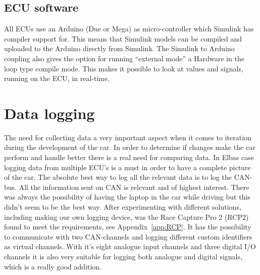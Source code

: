 \subsection{ECU software}
All ECUs use an Arduino (Due or Mega) as micro-controller which Simulink has
compiler support for. This means that Simulink models can be compiled and
uploaded to the Arduino directly from Simulink. The Simulink to Arduino coupling also
gives the option for running ``external mode'' a Hardware in the loop type compile mode.
This makes it possible to look at values and signals, running on the ECU, in
real-time.

\section{Data logging} 
The need for collecting data a very important aspect when
it comes to iteration during the development of the car. In order to determine
if changes make the car perform and handle better there is a real need for
comparing data.  In Elbas case logging data from multiple ECU's is a must in
order to have a complete picture of the car. The absolute best way to log all
the relevant data is to log the CAN-bus. All the information sent on CAN is
relevant and of highest interest. There was always the possibility of having the
laptop in the car while driving but this didn't seem to be the best way. After
experimenting with different solutions, including making our own logging device,
was the Race Capture Pro 2 (RCP2) found to meet the requirements,
see Appendix~\ref{app:RCP}. It has the possibility to communicate with two CAN-channels
and logging different custom identifiers as virtual channels. With it's eight
analogue input channels and three digital I/O channels it is also very suitable
for logging both analogue and digital signals, which is a really good addition.

